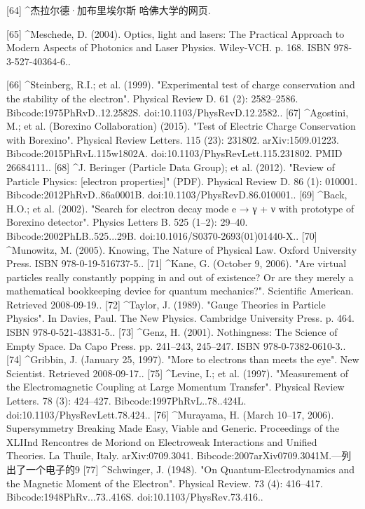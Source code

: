 [64]
^杰拉尔德·加布里埃尔斯 哈佛大学的网页.

[65]
^Meschede, D. (2004). Optics, light and lasers: The Practical Approach to Modern Aspects of Photonics and Laser Physics. Wiley-VCH. p. 168. ISBN 978-3-527-40364-6..

[66]
^Steinberg, R.I.; et al. (1999). "Experimental test of charge conservation and the stability of the electron". Physical Review D. 61 (2): 2582–2586. Bibcode:1975PhRvD..12.2582S. doi:10.1103/PhysRevD.12.2582..
[67]
^Agostini, M.; et al. (Borexino Collaboration) (2015). "Test of Electric Charge Conservation with Borexino". Physical Review Letters. 115 (23): 231802. arXiv:1509.01223. Bibcode:2015PhRvL.115w1802A. doi:10.1103/PhysRevLett.115.231802. PMID 26684111..
[68]
^J. Beringer (Particle Data Group); et al. (2012). "Review of Particle Physics: [electron properties]" (PDF). Physical Review D. 86 (1): 010001. Bibcode:2012PhRvD..86a0001B. doi:10.1103/PhysRevD.86.010001..
[69]
^Back, H.O.; et al. (2002). "Search for electron decay mode e → γ + ν with prototype of Borexino detector". Physics Letters B. 525 (1–2): 29–40. Bibcode:2002PhLB..525...29B. doi:10.1016/S0370-2693(01)01440-X..
[70]
^Munowitz, M. (2005). Knowing, The Nature of Physical Law. Oxford University Press. ISBN 978-0-19-516737-5..
[71]
^Kane, G. (October 9, 2006). "Are virtual particles really constantly popping in and out of existence? Or are they merely a mathematical bookkeeping device for quantum mechanics?". Scientific American. Retrieved 2008-09-19..
[72]
^Taylor, J. (1989). "Gauge Theories in Particle Physics". In Davies, Paul. The New Physics. Cambridge University Press. p. 464. ISBN 978-0-521-43831-5..
[73]
^Genz, H. (2001). Nothingness: The Science of Empty Space. Da Capo Press. pp. 241–243, 245–247. ISBN 978-0-7382-0610-3..
[74]
^Gribbin, J. (January 25, 1997). "More to electrons than meets the eye". New Scientist. Retrieved 2008-09-17..
[75]
^Levine, I.; et al. (1997). "Measurement of the Electromagnetic Coupling at Large Momentum Transfer". Physical Review Letters. 78 (3): 424–427. Bibcode:1997PhRvL..78..424L. doi:10.1103/PhysRevLett.78.424..
[76]
^Murayama, H. (March 10–17, 2006). Supersymmetry Breaking Made Easy, Viable and Generic. Proceedings of the XLIInd Rencontres de Moriond on Electroweak Interactions and Unified Theories. La Thuile, Italy. arXiv:0709.3041. Bibcode:2007arXiv0709.3041M.—列出了一个电子的9%
[77]
^Schwinger, J. (1948). "On Quantum-Electrodynamics and the Magnetic Moment of the Electron". Physical Review. 73 (4): 416–417. Bibcode:1948PhRv...73..416S. doi:10.1103/PhysRev.73.416..
